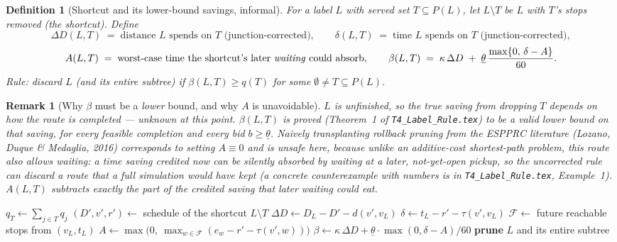 \documentclass[11pt]{article}
\newtheorem{definition}{Definition}
\newtheorem{remark}{Remark}
\newcommand{\thl}{\underline{\theta}}
\begin{document}
\begin{definition}[Shortcut and its lower-bound savings, informal]\label{def:layer3}
For a label $L$ with served set $T\subseteq P(L)$, let $L\setminus T$ be $L$ with $T$'s stops
removed (the \emph{shortcut}). Define
\[
\Delta D(L,T) \;=\; \text{distance $L$ spends on $T$ (junction-corrected)}, \qquad
\delta(L,T) \;=\; \text{time $L$ spends on $T$ (junction-corrected)},
\]
\[
A(L,T) \;=\; \text{worst-case time the shortcut's later \emph{waiting} could absorb},
\qquad
\beta(L,T) \;=\; \kappa\,\Delta D \;+\; \thl\,\frac{\max\{0,\,\delta-A\}}{60}.
\]
\emph{Rule:} discard $L$ (and its entire subtree) if $\beta(L,T)\ge q(T)$ for some
$\emptyset\ne T\subseteq P(L)$.
\end{definition}

\begin{remark}[Why $\beta$ must be a \emph{lower} bound, and why $A$ is unavoidable]
$L$ is unfinished, so the true saving from dropping $T$ depends on how the route is completed
--- unknown at this point. $\beta(L,T)$ is proved (Theorem~1 of \texttt{T4\_Label\_Rule.tex})
to be a valid lower bound on that saving, for \emph{every} feasible completion and every bid
$b\ge\thl$. Naively transplanting rollback pruning from the ESPPRC literature (Lozano, Duque \&
Medaglia, 2016) corresponds to setting $A\equiv0$ and is \emph{unsafe} here, because unlike an
additive-cost shortest-path problem, this route also allows \emph{waiting}: a time saving
credited now can be silently absorbed by waiting at a later, not-yet-open pickup, so the
uncorrected rule can discard a route that a full simulation would have kept (a concrete
counterexample with numbers is in \texttt{T4\_Label\_Rule.tex}, Example~1). $A(L,T)$ subtracts
exactly the part of the credited saving that later waiting could eat.
\end{remark}

\begin{algorithm}[H]
\caption{Layer 3 --- look-back FD-completion check (fires right after serving $T$)}
\label{alg:layer3}
\begin{algorithmic}[1]
\Function{TryFire}{$L$, served set $T$, FD prices $q$, $\thl$, $\kappa$}
  \State $q_T \gets \sum_{j\in T} q_j$
  \State $(D',v',r') \gets$ schedule of the shortcut $L\setminus T$ 
  \State $\Delta D \gets D_L - D' - d(v',v_L)$
  \State $\delta \gets t_L - r' - \tau(v',v_L)$
  \State $\mathcal{F} \gets$ future reachable stops from $(v_L,t_L)$ 
  \State $A \gets \max\bigl(0,\ \max_{w\in\mathcal{F}}(e_w - r' - \tau(v',w))\bigr)$
  \State $\beta \gets \kappa\,\Delta D + \thl\cdot\max(0,\delta-A)/60$
    \State \textbf{prune} $L$ and its entire subtree 
  \EndIf
\EndFunction
\end{algorithmic}
\end{algorithm}
\end{document}
